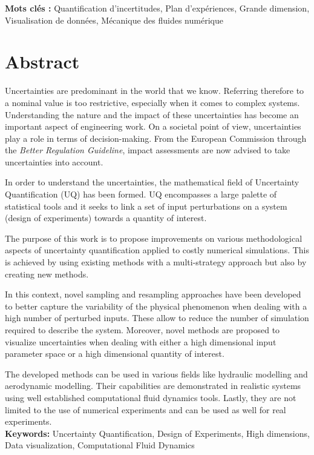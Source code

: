 \textbf{Mots clés :} Quantification d'incertitudes, Plan d'expériences, Grande dimension, Visualisation de données, Mécanique des fluides numérique %


\chapter*{Abstract}

Uncertainties are predominant in the world that we know. Referring therefore to a nominal value is too restrictive, especially when it comes to complex systems. Understanding the nature and the impact of these uncertainties has become an important aspect of engineering work. On a societal point of view, uncertainties play a role in terms of decision-making. From the European Commission through the \emph{Better Regulation Guideline}, impact assessments are now advised to take uncertainties into account.

In order to understand the uncertainties, the mathematical field of Uncertainty Quantification (UQ) has been formed. UQ encompasses a large palette of statistical tools and it seeks to link a set of input perturbations on a system (design of experiments) towards a quantity of interest.

The purpose of this work is to propose improvements on various methodological aspects of uncertainty quantification applied to costly numerical simulations. This is achieved by using existing methods with a multi-strategy approach but also by creating new methods. 

In this context, novel sampling and resampling approaches have been developed to better capture the variability of the physical phenomenon when dealing with a high number of perturbed inputs. These allow to reduce the number of simulation required to describe the system. Moreover, novel methods are proposed to visualize uncertainties when dealing with either a high dimensional input parameter space or a high dimensional quantity of interest.

The developed methods can be used in various fields like hydraulic modelling and aerodynamic modelling. Their capabilities are demonstrated in realistic systems using well established computational fluid dynamics tools. Lastly, they are not limited to the use of numerical experiments and can be used as well for real experiments.\\

\textbf{Keywords:} Uncertainty Quantification, Design of Experiments, High dimensions, Data visualization, Computational Fluid Dynamics %




